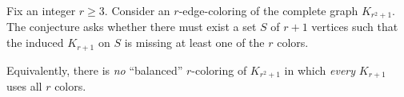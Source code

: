 Fix an integer $r\ge3$. Consider an $r$-edge-coloring of the complete graph
$K_{r^2+1}$.
The conjecture asks whether there must exist a set $S$ of $r+1$ vertices such
that the induced $K_{r+1}$ on $S$ is missing at least one of the $r$ colors.

Equivalently, there is \emph{no} ``balanced'' $r$-coloring of $K_{r^2+1}$ in which
\emph{every} $K_{r+1}$ uses all $r$ colors.
